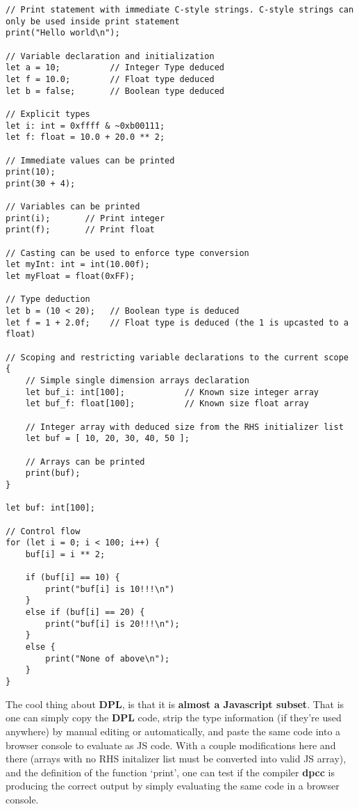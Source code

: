 \documentclass[a4paper]{article}
\begin{document}
\begin{lstlisting}[laguage=DPL]
// Print statement with immediate C-style strings. C-style strings can only be used inside print statement
print("Hello world\n");

// Variable declaration and initialization
let a = 10;          // Integer Type deduced
let f = 10.0;        // Float type deduced
let b = false;       // Boolean type deduced

// Explicit types
let i: int = 0xffff & ~0xb00111;
let f: float = 10.0 + 20.0 ** 2;

// Immediate values can be printed
print(10);
print(30 + 4);

// Variables can be printed
print(i);       // Print integer
print(f);       // Print float

// Casting can be used to enforce type conversion
let myInt: int = int(10.00f);
let myFloat = float(0xFF);

// Type deduction
let b = (10 < 20);   // Boolean type is deduced
let f = 1 + 2.0f;    // Float type is deduced (the 1 is upcasted to a float)

// Scoping and restricting variable declarations to the current scope
{
    // Simple single dimension arrays declaration
    let buf_i: int[100];            // Known size integer array
    let buf_f: float[100];          // Known size float array

    // Integer array with deduced size from the RHS initializer list
    let buf = [ 10, 20, 30, 40, 50 ];

    // Arrays can be printed
    print(buf);
}

let buf: int[100];

// Control flow
for (let i = 0; i < 100; i++) {
    buf[i] = i ** 2;

    if (buf[i] == 10) {
        print("buf[i] is 10!!!\n")
    }
    else if (buf[i] == 20) {
        print("buf[i] is 20!!!\n");
    }
    else {
        print("None of above\n");
    }
}
\end{lstlisting}

The cool thing about \textbf{DPL}, is that it is \textbf{almost a Javascript subset}.
That is one can simply copy the \textbf{DPL} code, strip the type information (if they're used
anywhere) by manual editing or automatically, and paste the same code into a browser console to evaluate as JS code.
With a couple modifications here and there (arrays with no RHS initalizer list must be converted into valid
JS array), and the definition of the function `print', one can
test if the compiler \textbf{dpcc} is producing the correct output by simply
evaluating the same code in a browser console.
\end{document}

